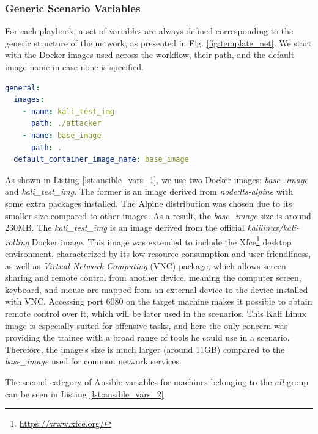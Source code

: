 \subsubsection{Generic Scenario Variables} \label{sec:generic_scenario_variables}

For each playbook, a set of variables are always defined corresponding to the generic structure of the network, as presented in Fig. \ref{fig:template_net}. We start with the Docker images used across the workflow, their path, and the default image name in case none is specified.

\begin{lstlisting}[language=yaml,caption=Ansible Variables - Docker Images.,numbers=none,label={lst:ansible_vars_1}]
general:
  images:
    - name: kali_test_img
      path: ./attacker
    - name: base_image
      path: .
  default_container_image_name: base_image
\end{lstlisting}

As shown in Listing \ref{lst:ansible_vars_1}, we use two Docker images: \textit{base\_image} and \textit{kali\_test\_img}. The former is an image derived from \textit{node:lts-alpine} with some extra packages installed. The Alpine distribution was chosen due to its smaller size compared to other images. As a result, the \textit{base\_image} size is around 230MB. The \textit{kali\_test\_img} is an image derived from the official \textit{kalilinux/kali-rolling} Docker image. This image was extended to include the Xfce\footnote{\url{https://www.xfce.org/}} desktop environment, characterized by its low resource consumption and user-friendliness, as well as \textit{Virtual Network Computing} (VNC) package, which allows screen sharing and remote control from another device, meaning the computer screen, keyboard, and mouse are mapped from an external device to the device installed with VNC. Accessing port 6080 on the target machine makes it possible to obtain remote control over it, which will be later used in the scenarios. This Kali Linux image is especially suited for offensive tasks, and here the only concern was providing the trainee with a broad range of tools he could use in a scenario. Therefore, the image's size is much larger (around 11GB) compared to the \textit{base\_image} used for common network services.

The second category of Ansible variables for machines belonging to the \textit{all} group can be seen in Listing \ref{lst:ansible_vars_2}.

